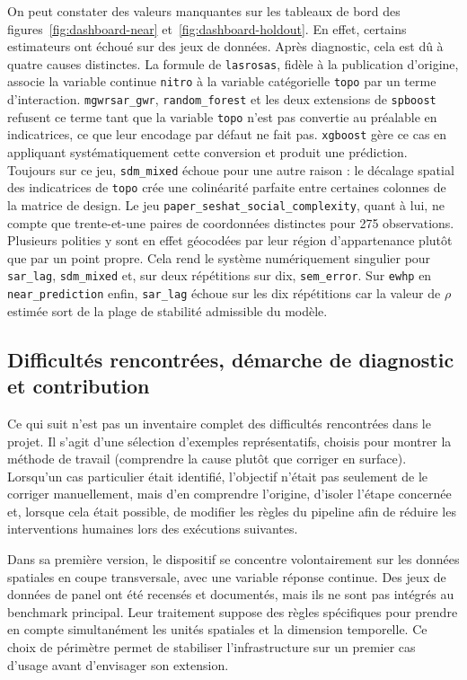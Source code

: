 \documentclass[11pt,a4paper]{article}
\begin{document}
On peut constater des valeurs manquantes sur les tableaux de bord des figures~\ref{fig:dashboard-near} et~\ref{fig:dashboard-holdout}. En effet, certains estimateurs ont échoué sur des jeux de données. Après diagnostic, cela est dû à quatre causes distinctes. La formule de \texttt{lasrosas}, fidèle à la publication d'origine, associe la variable continue \texttt{nitro} à la variable catégorielle \texttt{topo} par un terme d'interaction. \texttt{mgwrsar\_gwr}, \texttt{random\_forest} et les deux extensions de \texttt{spboost} refusent ce terme tant que la variable \texttt{topo} n'est pas convertie au préalable en indicatrices, ce que leur encodage par défaut ne fait pas. \texttt{xgboost} gère ce cas en appliquant systématiquement cette conversion et produit une prédiction. Toujours sur ce jeu, \texttt{sdm\_mixed} échoue pour une autre raison : le décalage spatial des indicatrices de \texttt{topo} crée une colinéarité parfaite entre certaines colonnes de la matrice de design. Le jeu \texttt{paper\_seshat\_social\_complexity}, quant à lui, ne compte que trente-et-une paires de coordonnées distinctes pour 275 observations. Plusieurs polities y sont en effet géocodées par leur région d'appartenance plutôt que par un point propre. Cela rend le système numériquement singulier pour \texttt{sar\_lag}, \texttt{sdm\_mixed} et, sur deux répétitions sur dix, \texttt{sem\_error}. Sur \texttt{ewhp} en \texttt{near\_prediction} enfin, \texttt{sar\_lag} échoue sur les dix répétitions car la valeur de $\rho$ estimée sort de la plage de stabilité admissible du modèle.

\subsection{Difficultés rencontrées, démarche de diagnostic et contribution}

Ce qui suit n'est pas un inventaire complet des difficultés rencontrées dans le projet. Il s'agit d'une sélection d'exemples représentatifs, choisis pour montrer la méthode de travail (comprendre la cause plutôt que corriger en surface). Lorsqu'un cas particulier était identifié, l'objectif n'était pas seulement de le corriger manuellement, mais d'en comprendre l'origine, d'isoler l'étape concernée et, lorsque cela était possible, de modifier les règles du pipeline afin de réduire les interventions humaines lors des exécutions suivantes.

Dans sa première version, le dispositif se concentre volontairement sur les données spatiales en coupe transversale, avec une variable réponse continue. Des jeux de données de panel ont été recensés et documentés, mais ils ne sont pas intégrés au benchmark principal. Leur traitement suppose des règles spécifiques pour prendre en compte simultanément les unités spatiales et la dimension temporelle. Ce choix de périmètre permet de stabiliser l'infrastructure sur un premier cas d'usage avant d'envisager son extension.
\end{document}
